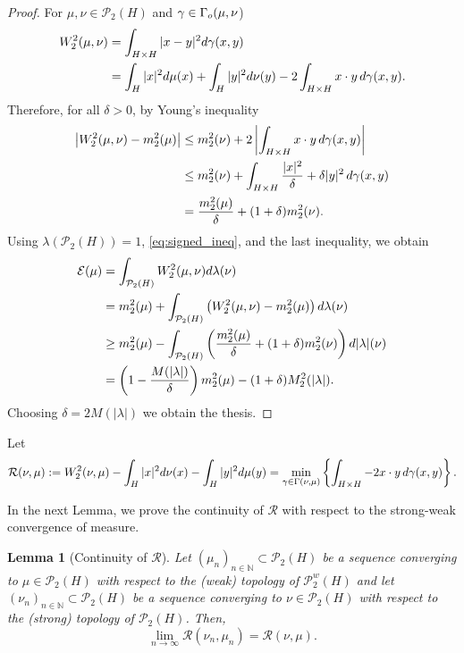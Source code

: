 \documentclass[12pt,a4paper]{article}
\newcommand{\N}{\mathbb{N}}
\renewcommand{\P}{\mathcal{P}}
\renewcommand{\d}{{\rm d}}
\newcommand{\X}{\mathcal{P}_2(H)}
\theoremstyle{plain}
\newtheorem{lemma}[theorem]{Lemma}
\theoremstyle{definition}
\begin{document}
\begin{proof}
For $\mu,\nu\in \X$ and $\gamma \in \Gamma_{\rm o}(\mu,\nu$) 
\begin{align*}
	W_2^2(\mu,\nu) &= \int_{H \times H}|x-y|^2\d\gamma(x,y) \\
	&=\int_{H}|x|^2\d\mu(x) +  \int_{H}|y|^2\d\nu(y) -2 \int_{H \times H}x\cdot y\,\d\gamma(x,y).
\end{align*}
Therefore, for all $\delta>0$, by Young's inequality
\begin{align*}
	\left|W_2^2(\mu,\nu) -m_2^2(\mu)\right|&\leq m_2^2(\nu)+ 2 \left|\int_{H \times H}x\cdot y\,\d\gamma(x,y)\right| \\
	& \leq m_2^2(\nu)+ \int_{H \times H}\frac{|x|^2}{\delta} +\delta |y|^2\,\d\gamma(x,y)\\
	& =\frac{m_2^2(\mu)}{\delta} +(1+\delta) m_2^2(\nu).
\end{align*}
Using $\lambda(\X)=1$, \eqref{eq:signed_ineq}, and the last inequality, we obtain
\begin{align*}
	\mathcal{E}(\mu) & = \int_{\X} W_2^2(\mu,\nu)\d\lambda(\nu) \\
		& =m_2^2(\mu)+\int_{\X}\left( W_2^2(\mu,\nu)-m_2^2(\mu)\right)\d\lambda(\nu)\\
		& \geq m_2^2(\mu) - \int_{\X} \left( \frac{m_2^2(\mu)}{\delta} +(1+\delta) m_2^2(\nu) \right)\d|\lambda|(\nu)\\
				& =  \left(1-\frac{M(|\lambda|)}{\delta}\right)m_2^2(\mu) -(1+\delta)M_2^2(|\lambda|).
\end{align*}
Choosing $\delta=2M(|\lambda|)$ we obtain the thesis.
\end{proof}
Let 
\begin{equation*}
	\mathcal{R}(\nu,\mu):=W_2^2(\nu,\mu)-\int_{H}|x|^2\d\nu(x)-\int_{H}|y|^2\d\mu(y)=\min_{\gamma \in \Gamma(\nu,\mu)}\left\{ \int_{H \times H}-2x\cdot y\,\d\gamma(x,y)\right\}.
\end{equation*}


In the next Lemma, we prove the continuity of $\mathcal R$ with respect to the strong-weak convergence of measure. 
\begin{lemma}[Continuity of $\mathcal R$]
\label{lemma:Rcont}
Let $(\mu_n)_{n\in \N}\subset \X$ be a sequence converging to $\mu \in \X$ with respect to the (weak) topology of $\P_2^w(H)$ and let $(\nu_n)_{n\in \N}\subset \X$ be a sequence converging to $\nu \in \X$ with respect to the (strong) topology of $\P_2(H)$. 
Then, %
\begin{equation}
\label{eq:lsc_2}
	\lim_{n \to \infty}\mathcal R (\nu_n,\mu_n)=\mathcal R (\nu,\mu).
\end{equation}
\end{lemma}
\end{document}
